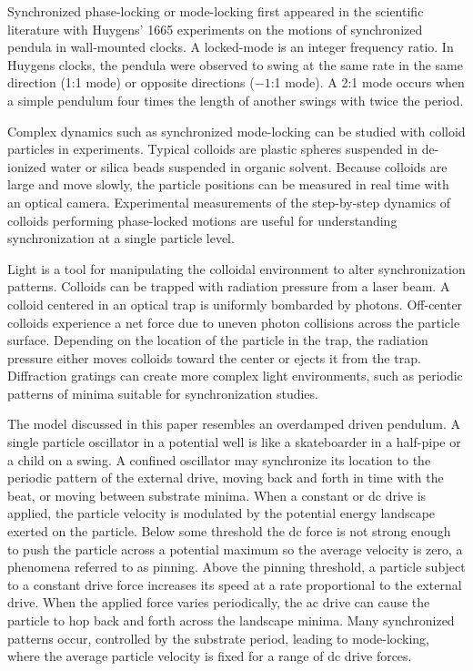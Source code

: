 \documentclass[preprint,showpacs,preprintnumbers,amsmath,amssymb,aps,prb]{revtex4-1}
\theoremstyle{remark}
\begin{document}
Synchronized phase-locking or mode-locking 
first appeared in the scientific literature
with 
Huygens' 1665 experiments on the
motions of synchronized 
pendula in wall-mounted clocks.\cite{Bennett2002}
A locked-mode is an integer frequency ratio.
In Huygens clocks,
the pendula were observed to swing at the  same rate
in the same direction (1:1 mode) or
opposite directions ($-1$:1 mode).
A 2:1 mode occurs when a simple pendulum four
times the length of another swings with twice the period.

Complex dynamics such as synchronized mode-locking
can be studied with
colloid particles in experiments.
Typical colloids are   
plastic spheres suspended in
de-ionized water or silica beads suspended in organic solvent.
Because 
colloids are large 
and move slowly, the
particle positions 
can be measured in real time 
with an optical camera.\cite{Pertsinidis2001}
Experimental measurements of the
step-by-step dynamics of 
colloids performing phase-locked motions
are useful for
understanding synchronization at a single particle level.\cite{Juniper2015,Juniper2017}

Light is a
tool for manipulating the colloidal environment
to alter synchronization patterns.
Colloids can be trapped
with 
radiation pressure from 
a laser beam.\cite{Ashkin1997}
A colloid centered in an optical trap is 
uniformly bombarded by photons. 
Off-center colloids 
experience a net force
due to uneven photon collisions across
the particle surface.
Depending on the 
location of the particle in the trap,
the radiation pressure either moves colloids toward the center 
or ejects it from the trap.
Diffraction gratings can create
more complex light environments, 
such as periodic patterns of minima
suitable for synchronization studies.\cite{Grier2003}

The model discussed in this paper
resembles an overdamped driven pendulum.
A single particle oscillator
in a potential well is 
like a skateboarder in a half-pipe or
a child on a swing.
A confined oscillator may 
synchronize its location
to the periodic pattern of the external drive,
moving back and forth in time with
the beat,
or moving between substrate minima.
When 
a constant or 
dc drive is applied,
the particle velocity is modulated by 
the potential energy landscape exerted on the particle.  %
Below some threshold  
the dc force is not strong enough to push the particle
across a potential maximum so the average velocity is zero,
a phenomena referred to as pinning.\cite{Reichhardt2017}
Above the pinning threshold,
a particle subject to a constant
drive force  increases its speed at a rate proportional
to the external drive.  
When the applied force varies periodically,
the ac drive can 
cause the particle to hop back and forth across
the landscape minima.
Many synchronized patterns occur,
controlled by the substrate period,
leading to 
mode-locking,
where the average particle velocity
is fixed for a range of dc drive forces.\cite{Reichhardt2015}
\end{document}
